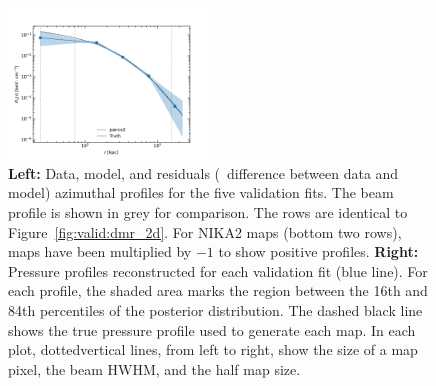 \begin{figure}[tp]
    \includegraphics[height=4cm, trim={0.5cm 0.3cm 1.3cm 1.3cm}, clip]{../validation/results/C3/NIKA2/pressure_profile.pdf}
    \caption{
        \textbf{Left:} Data, model, and residuals (\ie\ difference between data and model) azimuthal profiles for the five validation fits.
        The beam profile is shown in grey for comparison.
        The rows are identical to Figure~\ref{fig:valid:dmr_2d}.
        For NIKA2 maps (bottom two rows), maps have been multiplied by $-1$ to show positive profiles.
        \textbf{Right:} Pressure profiles reconstructed for each validation fit (blue line).
        For each profile, the shaded area marks the region between the 16th and 84th percentiles of the posterior distribution.
        The dashed black line shows the true pressure profile used to generate each map.
        In each plot, dottedvertical lines, from left to right, show the size of a map pixel, the beam HWHM, and the half map size.
    }
    \label{fig:valid:profiles}
\end{figure}
